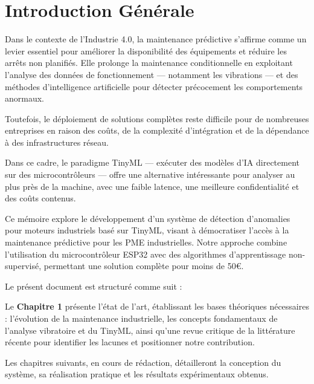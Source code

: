 \chapter*{Introduction Générale}
\thispagestyle{empty}

Dans le contexte de l'Industrie 4.0, la maintenance prédictive s'affirme comme un levier essentiel pour améliorer la disponibilité des équipements et réduire les arrêts non planifiés. Elle prolonge la maintenance conditionnelle en exploitant l'analyse des données de fonctionnement — notamment les vibrations — et des méthodes d'intelligence artificielle pour détecter précocement les comportements anormaux.

Toutefois, le déploiement de solutions complètes reste difficile pour de nombreuses entreprises en raison des coûts, de la complexité d'intégration et de la dépendance à des infrastructures réseau.

Dans ce cadre, le paradigme TinyML — exécuter des modèles d'IA directement sur des microcontrôleurs — offre une alternative intéressante pour analyser au plus près de la machine, avec une faible latence, une meilleure confidentialité et des coûts contenus.

Ce mémoire explore le développement d'un système de détection d'anomalies pour moteurs industriels basé sur TinyML, visant à démocratiser l'accès à la maintenance prédictive pour les PME industrielles. Notre approche combine l'utilisation du microcontrôleur ESP32 avec des algorithmes d'apprentissage non-supervisé, permettant une solution complète pour moins de 50€.

Le présent document est structuré comme suit :

Le \textbf{Chapitre 1} présente l'état de l'art, établissant les bases théoriques nécessaires : l'évolution de la maintenance industrielle, les concepts fondamentaux de l'analyse vibratoire et du TinyML, ainsi qu'une revue critique de la littérature récente pour identifier les lacunes et positionner notre contribution.

Les chapitres suivants, en cours de rédaction, détailleront la conception du système, sa réalisation pratique et les résultats expérimentaux obtenus.